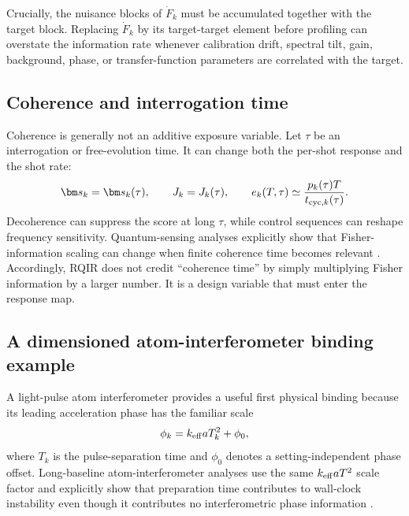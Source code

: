 Crucially, the nuisance blocks of $\dot F_k$ must be accumulated together with the target block. Replacing $\dot F_k$ by its target-target element before profiling can overstate the information rate whenever calibration drift, spectral tilt, gain, background, phase, or transfer-function parameters are correlated with the target.

\subsection{Coherence and interrogation time}

Coherence is generally not an additive exposure variable. Let $\tau$ be an interrogation or free-evolution time. It can change both the per-shot response and the shot rate:
\begin{equation}
 \bm s_k=\bm s_k(\tau),
 \qquad
 J_k=J_k(\tau),
 \qquad
 e_k(T,\tau)\simeq
 \frac{p_k(\tau)T}{t_{{\rm cyc},k}(\tau)}.
\label{eq:coherence-map}
\end{equation}
Decoherence can suppress the score at long $\tau$, while control sequences can reshape frequency sensitivity. Quantum-sensing analyses explicitly show that Fisher-information scaling can change when finite coherence time becomes relevant \cite{Gefen2017}. Accordingly, RQIR does not credit ``coherence time'' by simply multiplying Fisher information by a larger number. It is a design variable that must enter the response map.

\subsection{A dimensioned atom-interferometer binding example}

A light-pulse atom interferometer provides a useful first physical binding because its leading acceleration phase has the familiar scale
\begin{equation}
 \phi_k = k_{\rm eff} a T_k^2+\phi_0,
\label{eq:ai-phase}
\end{equation}
where $T_k$ is the pulse-separation time and $\phi_0$ denotes a setting-independent phase offset. Long-baseline atom-interferometer analyses use the same $k_{\rm eff}aT^2$ scale factor and explicitly show that preparation time contributes to wall-clock instability even though it contributes no interferometric phase information \cite{Schilling2020}.

